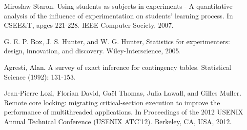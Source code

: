 \begin{thebibliography}{4}
 Miroslaw Staron. Using students as subjects in experiments - A quantitative analysis of the influence of experimentation on students' learning process. In CSEE\&T, apges 221-228. IEEE Computer Society, 2007.

 G. E. P. Box, J. S. Hunter, and W. G. Hunter, Statistics for experimenters: design, innovation, and discovery. Wiley-Interscience, 2005.

 Agresti, Alan. A survey of exact inference for contingency tables. Statistical Science (1992): 131-153.

 Jean-Pierre Lozi, Florian David, Ga\"{e}l Thomas, Julia Lawall, and Gilles Muller. Remote core locking: migrating critical-section execution to improve the performance of multithreaded applications. In Proceedings of the 2012 USENIX Annual Technical Conference (USENIX ATC'12). Berkeley, CA, USA, 2012.

\end{thebibliography}